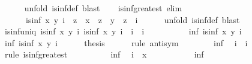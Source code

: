 \begin{isabellebody}
\ \ \ \ \isamarkupfalse%
\ {\isacharparenleft}unfold\ is{\isacharunderscore}inf{\isacharunderscore}def{\isacharparenright}\ blast\isanewline
\isanewline
\ \ \isamarkupfalse%
\ is{\isacharunderscore}inf{\isacharunderscore}greatest\ {\isacharbrackleft}elim{\isacharquery}{\isacharbrackright}{\isacharcolon}\isanewline
\ \ \ \ \ \ {\isachardoublequoteopen}is{\isacharunderscore}inf\ x\ y\ i\ {\isasymLongrightarrow}\ z\ {\isasymsqsubseteq}\ x\ {\isasymLongrightarrow}\ z\ {\isasymsqsubseteq}\ y\ {\isasymLongrightarrow}\ z\ {\isasymsqsubseteq}\ i{\isachardoublequoteclose}\isanewline
\ \ \ \ \isamarkupfalse%
\ {\isacharparenleft}unfold\ is{\isacharunderscore}inf{\isacharunderscore}def{\isacharparenright}\ blast%
\endisataginvisible
{\isafoldinvisible}%
%
\isadeliminvisible
\isanewline
%
\endisadeliminvisible
\isanewline
\ \ \isamarkupfalse%
\ is{\isacharunderscore}inf{\isacharunderscore}uniq{\isacharcolon}\ {\isachardoublequoteopen}{\isasymlbrakk}is{\isacharunderscore}inf\ x\ y\ i{\isacharsemicolon}\ is{\isacharunderscore}inf\ x\ y\ i{\isacharprime}{\isasymrbrakk}\ {\isasymLongrightarrow}\ i\ {\isacharequal}\ i{\isacharprime}{\isachardoublequoteclose}\isanewline
%
\isadelimproof
\ \ %
\endisadelimproof
%
\isatagproof
{}\isamarkupfalse%
\ {\isacharminus}\isanewline
\ \ \ \ \isamarkupfalse%
\ inf{\isacharcolon}\ {\isachardoublequoteopen}is{\isacharunderscore}inf\ x\ y\ i{\isachardoublequoteclose}\isanewline
\ \ \ \ \isamarkupfalse%
\ inf{\isacharprime}{\isacharcolon}\ {\isachardoublequoteopen}is{\isacharunderscore}inf\ x\ y\ i{\isacharprime}{\isachardoublequoteclose}\isanewline
\ \ \ \ \isamarkupfalse%
\ {\isacharquery}thesis\isanewline
\ \ \ \ \isamarkupfalse%
\ {\isacharparenleft}rule\ anti{\isacharunderscore}sym{\isacharparenright}\isanewline
\ \ \ \ \ \ \isamarkupfalse%
\ inf{\isacharprime}\ \isamarkupfalse%
\ {\isachardoublequoteopen}i\ {\isasymsqsubseteq}\ i{\isacharprime}{\isachardoublequoteclose}\isanewline
\ \ \ \ \ \ \isamarkupfalse%
\ {\isacharparenleft}rule\ is{\isacharunderscore}inf{\isacharunderscore}greatest{\isacharparenright}\isanewline
\ \ \ \ \ \ \ \ \isamarkupfalse%
\ inf\ \isamarkupfalse%
\ {\isachardoublequoteopen}i\ {\isasymsqsubseteq}\ x{\isachardoublequoteclose}\ \isacommand{{\isachardot}{\isachardot}}\isamarkupfalse%
\isanewline
\ \ \ \ \ \ \ \ \isamarkupfalse%
\ inf\ \isamarkupfalse%

\end{isabellebody}

